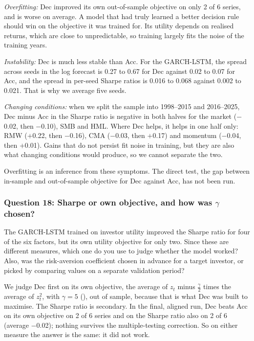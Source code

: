 \textit{Overfitting:} Dec improved its own out-of-sample objective on only 2 of 6 series, and is worse on average. A model that had truly learned a better decision rule should win on the objective it was trained for. Its utility depends on realised returns, which are close to unpredictable, so training largely fits the noise of the training years.

\textit{Instability:} Dec is much less stable than Acc. For the GARCH-LSTM, the spread across seeds in the log forecast is 0.27 to 0.67 for Dec against 0.02 to 0.07 for Acc, and the spread in per-seed Sharpe ratios is 0.016 to 0.068 against 0.002 to 0.021. That is why we average five seeds.

\textit{Changing conditions:} when we split the sample into 1998--2015 and 2016--2025, Dec minus Acc in the Sharpe ratio is negative in both halves for the market ($-$0.02, then $-$0.10), SMB and HML. Where Dec helps, it helps in one half only: RMW ($+$0.22, then $-$0.16), CMA ($-$0.03, then $+$0.17) and momentum ($-$0.04, then $+$0.01). Gains that do not persist fit noise in training, but they are also what changing conditions would produce, so we cannot separate the two.

Overfitting is an inference from these symptoms. The direct test, the gap between in-sample and out-of-sample objective for Dec against Acc, has not been run.

\subsubsection*{Question 18: Sharpe or own objective, and how was $\gamma$ chosen?}
\begin{question}
The GARCH-LSTM trained on investor utility improved the Sharpe ratio for four of the six factors, but its own utility objective for only two. Since these are different measures, which one do you use to judge whether the model worked? Also, was the risk-aversion coefficient chosen in advance for a target investor, or picked by comparing values on a separate validation period?
\end{question}
We judge Dec first on its own objective, the average of $z_t$ minus $\frac{\gamma}{2}$ times the average of $z_t^2$, with $\gamma=5$ (), out of sample, because that is what Dec was built to maximise. The Sharpe ratio is secondary. In the final, aligned run, Dec beats Acc on its own objective on 2 of 6 series and on the Sharpe ratio also on 2 of 6 (average $-$0.02); nothing survives the multiple-testing correction. So on either measure the answer is the same: it did not work.

